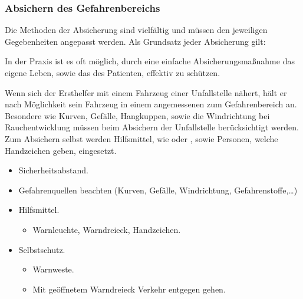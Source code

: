 \subsubsection{Absichern des Gefahrenbereichs}

Die Methoden der Absicherung sind vielfältig und müssen den jeweiligen
Gegebenheiten angepasst werden. Als Grundsatz jeder
Absicherung gilt:


In der Praxis ist es oft möglich, durch
eine einfache Absicherungsmaßnahme das eigene Leben, sowie
das des Patienten, effektiv zu schützen.

{
%
Wenn sich der Ersthelfer mit einem Fahrzeug einer
Unfallstelle nähert, hält er nach Möglichkeit sein
Fahrzeug in einem angemessenen  zum Gefahrenbereich an.
Besondere  wie Kurven,
Gefälle, Hangkuppen, sowie die Windrichtung bei
Rauchentwicklung müssen beim Absichern der Unfallstelle
berücksichtigt werden. Zum Absichern selbst werden
Hilfsmittel, wie  oder , sowie
Personen, welche Handzeichen geben, eingesetzt. 
}{
\begin{itemize}
  \item Sicherheitsabstand.
  \item Gefahrenquellen beachten (Kurven, Gefälle,
  Windrichtung, Gefahrenstoffe,\ldots)
  \item Hilfsmittel.
  \begin{itemize}
    \item Warnleuchte, Warndreieck, Handzeichen.
  \end{itemize}
  \item Selbstschutz.
  \begin{itemize}
    \item Warnweste.
    \item Mit geöffnetem Warndreieck
    Verkehr entgegen gehen.
  \end{itemize}
\end{itemize}
}{}{}{}



